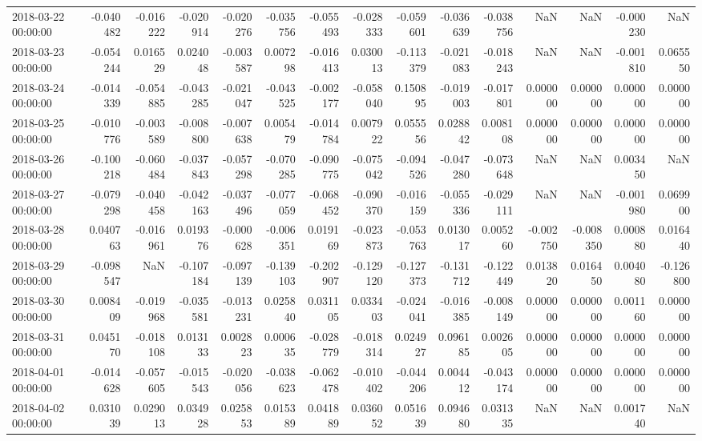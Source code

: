 \begin{tabular}{lrrrrrrrrrrrrrr}
2018-03-22 00:00:00 & -0.040482 & -0.016222 & -0.020914 & -0.020276 & -0.035756 & -0.055493 & -0.028333 & -0.059601 & -0.036639 & -0.038756 & NaN & NaN & -0.000230 & NaN \\
2018-03-23 00:00:00 & -0.054244 & 0.016529 & 0.024048 & -0.003587 & 0.007298 & -0.016413 & 0.030013 & -0.113379 & -0.021083 & -0.018243 & NaN & NaN & -0.001810 & 0.065550 \\
2018-03-24 00:00:00 & -0.014339 & -0.054885 & -0.043285 & -0.021047 & -0.043525 & -0.002177 & -0.058040 & 0.150895 & -0.019003 & -0.017801 & 0.000000 & 0.000000 & 0.000000 & 0.000000 \\
2018-03-25 00:00:00 & -0.010776 & -0.003589 & -0.008800 & -0.007638 & 0.005479 & -0.014784 & 0.007922 & 0.055556 & 0.028842 & 0.008108 & 0.000000 & 0.000000 & 0.000000 & 0.000000 \\
2018-03-26 00:00:00 & -0.100218 & -0.060484 & -0.037843 & -0.057298 & -0.070285 & -0.090775 & -0.075042 & -0.094526 & -0.047280 & -0.073648 & NaN & NaN & 0.003450 & NaN \\
2018-03-27 00:00:00 & -0.079298 & -0.040458 & -0.042163 & -0.037496 & -0.077059 & -0.068452 & -0.090370 & -0.016159 & -0.055336 & -0.029111 & NaN & NaN & -0.001980 & 0.069900 \\
2018-03-28 00:00:00 & 0.040763 & -0.016961 & 0.019376 & -0.000628 & -0.006351 & 0.019169 & -0.023873 & -0.053763 & 0.013017 & 0.005260 & -0.002750 & -0.008350 & 0.000880 & 0.016440 \\
2018-03-29 00:00:00 & -0.098547 & NaN & -0.107184 & -0.097139 & -0.139103 & -0.202907 & -0.129120 & -0.127373 & -0.131712 & -0.122449 & 0.013820 & 0.016450 & 0.004080 & -0.126800 \\
2018-03-30 00:00:00 & 0.008409 & -0.019968 & -0.035581 & -0.013231 & 0.025840 & 0.031105 & 0.033403 & -0.024041 & -0.016385 & -0.008149 & 0.000000 & 0.000000 & 0.001160 & 0.000000 \\
2018-03-31 00:00:00 & 0.045170 & -0.018108 & 0.013133 & 0.002823 & 0.000635 & -0.028779 & -0.018314 & 0.024927 & 0.096185 & 0.002605 & 0.000000 & 0.000000 & 0.000000 & 0.000000 \\
2018-04-01 00:00:00 & -0.014628 & -0.057605 & -0.015543 & -0.020056 & -0.038623 & -0.062478 & -0.010402 & -0.044206 & 0.004412 & -0.043174 & 0.000000 & 0.000000 & 0.000000 & 0.000000 \\
2018-04-02 00:00:00 & 0.031039 & 0.029013 & 0.034928 & 0.025853 & 0.015389 & 0.041889 & 0.036052 & 0.051639 & 0.094680 & 0.031335 & NaN & NaN & 0.001740 & NaN \\

\end{tabular}

